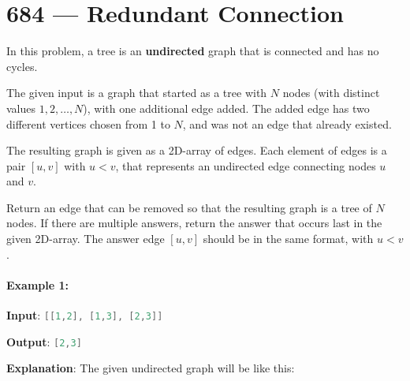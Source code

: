 \section{684 --- Redundant Connection}
In this problem, a tree is an \textbf{undirected} graph that is connected and has no cycles.

The given input is a graph that started as a tree with $N$ nodes (with distinct values $1, 2, \ldots, N$), with one additional edge added. The added edge has two different vertices chosen from 1 to $N$, and was not an edge that already existed.

The resulting graph is given as a 2D-array of edges. Each element of edges is a pair $[u, v]$ with $u < v$, that represents an undirected edge connecting nodes $u$ and $v$.

Return an edge that can be removed so that the resulting graph is a tree of $N$ nodes. If there are multiple answers, return the answer that occurs last in the given 2D-array. The answer edge $[u, v]$ should be in the same format, with $u < v$.

\paragraph{Example 1:}
\begin{flushleft}


\textbf{Input}: \lstinline[language=C++, basicstyle=\small\ttfamily, keywordstyle=\bfseries\color{green!40!black}]|[[1,2], [1,3], [2,3]]|

\textbf{Output}: \lstinline[language=C++, basicstyle=\small\ttfamily, keywordstyle=\bfseries\color{green!40!black}]|[2,3]|

\textbf{Explanation}: The given undirected graph will be like this:

\begin{figure}[H]
\end{figure}
\end{flushleft}

